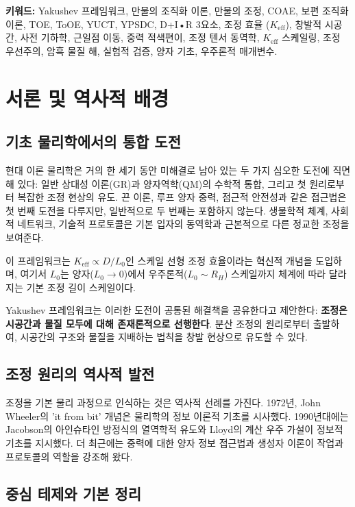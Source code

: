\documentclass[11pt,a4paper]{article}
\begin{document}
	\noindent\textbf{키워드:} Yakushev 프레임워크, 만물의 조직화 이론, 만물의 조정, COAE, 보편 조직화 이론, TOE, ToOE, YUCT, YPSDC, D+I•R 3요소, 조정 효율 ($K_{\mathrm{eff}}$), 창발적 시공간, 사전 기하학, 근일점 이동, 중력 적색편이, 조정 텐서 동역학, $K_{\mathrm{eff}}$ 스케일링, 조정 우선주의, 암흑 물질 해, 실험적 검증, 양자 기초, 우주론적 매개변수.
	
	\newpage
	
	\section{서론 및 역사적 배경}
	\subsection{기초 물리학에서의 통합 도전}
	현대 이론 물리학은 거의 한 세기 동안 미해결로 남아 있는 두 가지 심오한 도전에 직면해 있다: 일반 상대성 이론(GR)과 양자역학(QM)의 수학적 통합, 그리고 첫 원리로부터 복잡한 조정 현상의 유도. 끈 이론, 루프 양자 중력, 점근적 안전성과 같은 접근법은 첫 번째 도전을 다루지만, 일반적으로 두 번째는 포함하지 않는다. 생물학적 체계, 사회적 네트워크, 기술적 프로토콜은 기본 입자의 동역학과 근본적으로 다른 정교한 조정을 보여준다.
	
	이 프레임워크는 $K_{\mathrm{eff}} \propto D/L_0$인 스케일 선형 조정 효율이라는 혁신적 개념을 도입하며, 여기서 $L_0$는 양자($L_0 \to 0$)에서 우주론적($L_0 \sim R_H$) 스케일까지 체계에 따라 달라지는 기본 조정 길이 스케일이다.
	
	Yakushev 프레임워크는 이러한 도전이 공통된 해결책을 공유한다고 제안한다: \textbf{조정은 시공간과 물질 모두에 대해 존재론적으로 선행한다}. 분산 조정의 원리로부터 출발하여, 시공간의 구조와 물질을 지배하는 법칙을 창발 현상으로 유도할 수 있다.
	
	\subsection{조정 원리의 역사적 발전}
	조정을 기본 물리 과정으로 인식하는 것은 역사적 선례를 가진다. 1972년, John Wheeler의 'it from bit' 개념은 물리학의 정보 이론적 기초를 시사했다. 1990년대에는 Jacobson의 아인슈타인 방정식의 열역학적 유도와 Lloyd의 계산 우주 가설이 정보적 기초를 지시했다. 더 최근에는 중력에 대한 양자 정보 접근법과 생성자 이론이 작업과 프로토콜의 역할을 강조해 왔다.
	
	\subsection{중심 테제와 기본 정리}
	
\end{document}
